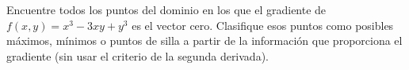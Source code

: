Encuentre todos los puntos del dominio en los que el gradiente de $f(x, y) = x^3 - 3xy + y^3$ es el vector cero. Clasifique esos puntos como posibles máximos, mínimos o puntos de silla a partir de la información que proporciona el gradiente (sin usar el criterio de la segunda derivada).
